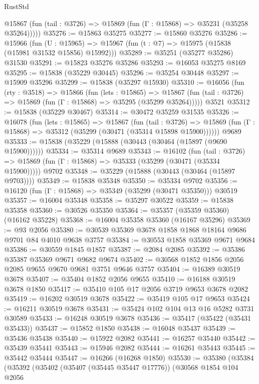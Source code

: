 \begin{lexlean}{RustStd}
\begin{coremodule}
      @15867 (fun (tail : @3726) => @15869 (fun (Γ : @15868) => @35231 (@35258 @35264)))))
@35276 := @15863 @35275
@35277 := @15860 @35276
@35286 := @15966
    (fun (U : @15965) => @15967 (fun (t : @7) => @15975 (@15838 (@15981 @31532 @15856) @15992)))
@35289 := @35251 (@35277 @35286) @31530
@35291 := @15823 @35276 @35286
@35293 := @16053 @35275 @8169
@35295 := @15838 (@35229 @30445)
@35296 := @35254 @30448
@35297 := @15909 @35296
@35299 := @15838 (@35297 @15930)
@35310 := @16056
    (fun (rty : @3518) =>
    @15866
      (fun (lets : @15865) =>
      @15867 (fun (tail : @3726) => @15869 (fun (Γ : @15868) => @35295 (@35299 @35264)))))
    @3521
@35312 := @15838 (@35229 @30467)
@35314 := @30472 @35259 @31535
@35326 := @16078
    (fun (lets : @15865) =>
    @15867
      (fun (tail : @3726) =>
      @15869 (fun (Γ : @15868) => @35312 (@35299 (@30471 (@35314 @15898 @15900))))))
    @9689
@35333 := @15838 (@35229 (@15888 (@30443 (@30464 (@15897 (@9690 @15900))))))
@35334 := @35314 @9689
@35343 := @16102
    (fun (tail : @3726) => @15869 (fun (Γ : @15868) => @35333 (@35299 (@30471 (@35334 @15900)))))
    @9702
@35348 := @35229 (@15888 (@30443 (@30464 (@15897 @9703))))
@35349 := @15838 @35348
@35350 := @35334 @9702
@35356 := @16120 (fun (Γ : @15868) => @35349 (@35299 (@30471 @35350))) @30519
@35357 := @16004 @35348
@35358 := @35297 @30522
@35359 := @15838 @35358
@35360 := @30526 @35350
@35364 := @35357 (@35359 @35360) (@16162 @35228)
@35368 := @16004 @35358 @35360 (@16167 @35296)
@35369 := @93 @2056
@35380 := @30539 @35369 @3678 @1858 @1868 @18164 @9686 @9701 @84 @4010 @9638 @3757
@35384 := @30553 @1858 @35369 @9671 @9684
@35386 := @30559 @1845 @1857
@35387 := @2084 @2085
@35392 := @35386 @35387 @35369 @9671 @9682 @9674
@35402 := @30568 @1852 @1856 @2056 @2085 @9655 @9670 @9681 @3751 @9646 @3757
@35404 := @16389 @30519 @3678
@35407 := @35404 @1852 @2056 @9655
@35410 := @16188 @30519 @3678 @1850
@35417 := @35410 @105 @17 @2056 @3719 @9653 @3678 @2082
@35419 := @16202 @30519 @3678
@35422 := @35419 @105 @17 @9653
@35424 := @16211 @30519 @3678
@35431 := @35424 @102 @104 @13 @16 @5282 @3731 @30589
@35433 := @16248 @30519 @3678
@35436 := @35417 (@35422 (@35431 @35433))
@35437 := @15852 @1850
@35438 := @16048 @35437
@35439 := @35436 @35438
@35440 := @15922 @2082
@35441 := @16257 @35440
@35442 := @35439 @35441
@35443 := @15946 @2082
@35444 := @16261 @35443
@35445 := @35442 @35444
@35447 := @16266 (@16268 @1850)
@35530 := @35380
    (@35384
      (@35392
        (@35402
          (@35407 (@35445 @35447 @17776))
          (@30568
            @1854
            @104
            @2056

\end{coremodule}
\end{lexlean}
